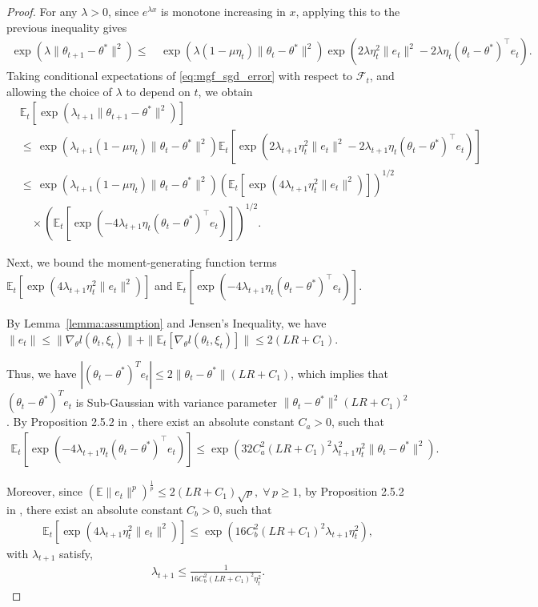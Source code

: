 \documentclass[11 pt]{article}
\begin{document}
\begin{proof}
For any $\lambda >0$, since $e^{\lambda x}$ is monotone increasing in $x$, applying this to the previous inequality gives
\begin{align}\label{eq:mgf_sgd_error}
    \exp(\lambda \|\theta_{t+1}-\theta^*\|^2)
    \leq \,&\exp(\lambda(1-\mu\eta_t)\|\theta_t-\theta^*\|^2)\exp(2\lambda\eta_t^2\|e_t\|^2-2\lambda\eta_t(\theta_t-\theta^*)^\top e_t).
\end{align}
Taking conditional expectations of \eqref{eq:mgf_sgd_error} with respect to $\mathcal{F}_t$, and allowing the choice of $\lambda$ to depend on $t$, we obtain
\begin{align*}
    &\mathbb{E}_t[\exp(\lambda_{t+1} \|\theta_{t+1}-\theta^*\|^2)]\\
    &\leq \,\exp(\lambda_{t+1}(1-\mu\eta_t)\|\theta_t-\theta^*\|^2)\mathbb{E}_t[\exp(2\lambda_{t+1}\eta_t^2\|e_t\|^2-2\lambda_{t+1}\eta_t(\theta_t-\theta^*)^\top e_t)]\\
    &\leq \,\exp(\lambda_{t+1}(1-\mu\eta_t)\|\theta_t-\theta^*\|^2)\left(\mathbb{E}_t[\exp(4\lambda_{t+1}\eta_t^2\|e_t\|^2)]\right)^{1/2}\\
    &\quad\times \left(\mathbb{E}_t[\exp(-4\lambda_{t+1}\eta_t(\theta_t-\theta^*)^\top e_t)]\right)^{1/2}\tag{conditional Cauchy–Schwarz Inequality}.
\end{align*}

Next, we bound the moment-generating function terms $\mathbb{E}_t[\exp(4\lambda_{t+1}\eta_t^2\|e_t\|^2)]$ and $\mathbb{E}_t[\exp(-4\lambda_{t+1}\eta_t(\theta_t-\theta^*)^\top e_t)]$.

By Lemma~\ref{lemma:assumption} and Jensen's Inequality, we have $\|e_t\|\leq\| \nabla_\theta l(\theta_t,\xi_t)\|+\| \mathbb{E}_t[\nabla_\theta l(\theta_t,\xi_t)]\|\leq 2(LR+C_1).$

Thus, we have $|(\theta_t-\theta^*)^Te_t|\leq 2\|\theta_t-\theta^*\|(LR+C_1)$, which implies that $(\theta_t-\theta^*)^Te_t$ is Sub-Gaussian with variance parameter $\|\theta_t-\theta^*\|^2(LR+C_1)^2$. By Proposition 2.5.2 in \cite{vershynin2018high}, there exist an absolute constant $C_a>0$, such that 
\begin{align}\label{eq:mgf_bound1}
\mathbb{E}_t[\exp(-4\lambda_{t+1}\eta_t(\theta_t-\theta^*)^\top e_t)]\leq \exp\left(32C_a^2(LR+C_1)^2\lambda_{t+1}^2\eta_t^2\|\theta_t-\theta^*\|^2\right).
\end{align}

Moreover, since $(\mathbb{E}\|e_t \|^p)^{\frac{1}{p}}\leq 2(LR+C_1)\sqrt{p}, \; \forall \, p\geq 1$, by Proposition 2.5.2 in \cite{vershynin2018high}, there exist an absolute constant $C_b>0$, such that
\begin{align}\label{eq:mgf_bound2}
\mathbb{E}_t[\exp(4\lambda_{t+1}\eta_t^2\|e_t\|^2)]\leq \exp(16C_b^2(LR+C_1)^2\lambda_{t+1}\eta_t^2),
\end{align}
with $\lambda_{t+1}$ satisfy,
\begin{align}\label{eq:lambda_0}
    \lambda_{t+1} \leq \frac{1}{16C_b^2(LR+C_1)^2\eta_t^2}.
\end{align}


\end{proof}
\end{document}
